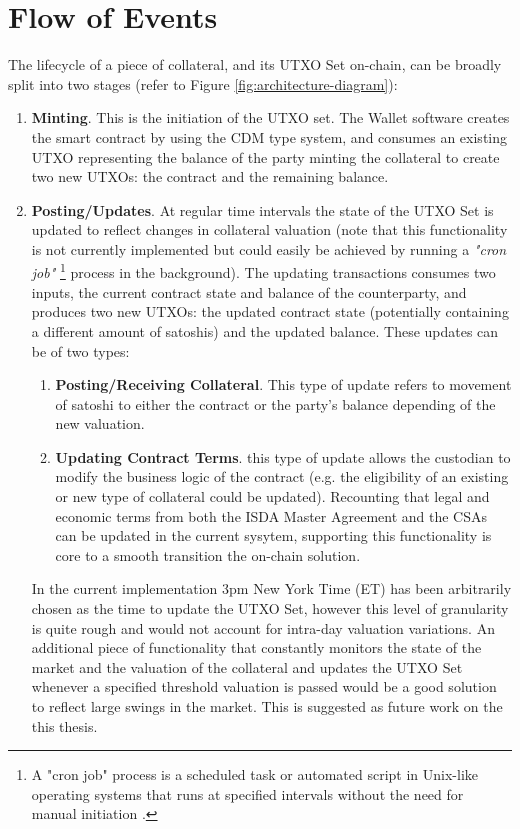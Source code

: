 \section{Flow of Events}
\label{sec:flow_of_events}

The lifecycle of a piece of collateral, and its UTXO Set on-chain, can be broadly split into two stages (refer to Figure \ref{fig:architecture-diagram}):

\begin{enumerate}
    \item \textbf{Minting}. This is the initiation of the UTXO set. The Wallet software creates the smart contract by using the CDM type system, and consumes an existing UTXO representing the balance of the party minting the collateral to create two new UTXOs: the contract and the remaining balance.  
    \item \textbf{Posting/Updates}. At regular time intervals the state of the UTXO Set is updated to reflect changes in collateral valuation (note that this functionality is not currently implemented but could easily be achieved by running a \textit{"cron job"} \footnote{A "cron job" process is a scheduled task or automated script in Unix-like operating systems that runs at specified intervals without the need for manual initiation \citep{cronjobs}.} process in the background). The updating transactions consumes two inputs, the current contract state and balance of the counterparty, and produces two new UTXOs: the updated contract state (potentially containing a different amount of satoshis) and the updated balance. These updates can be of two types:
    
    \begin{enumerate}
        \item \textbf{Posting/Receiving Collateral}. This type of update refers to movement of satoshi to either the contract or the party's balance depending of the new valuation.
        
        \item \textbf{Updating Contract Terms}. this type of update allows the custodian to modify the business logic of the contract (e.g. the eligibility of an existing or new type of collateral could be updated). Recounting that legal and economic terms from both the ISDA Master Agreement and the CSAs can be updated in the current sysytem, supporting this functionality is core to a smooth transition the on-chain solution.
    \end{enumerate}
    
    In the current implementation 3pm New York Time (ET) has been arbitrarily chosen as the time to update the UTXO Set, however this level of granularity is quite rough and would not account for intra-day valuation variations. An additional piece of functionality that constantly monitors the state of the market and the valuation of the collateral and updates the UTXO Set whenever a specified threshold valuation is passed would be a good solution to reflect large swings in the market. This is suggested as future work on the this thesis. \label{ny3pm}
\end{enumerate}

